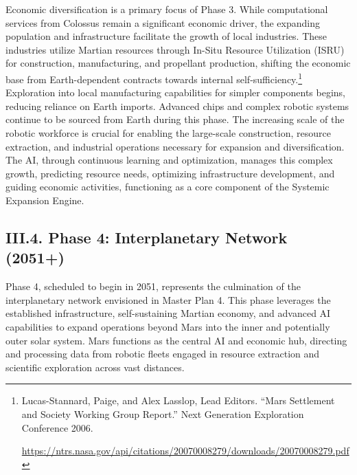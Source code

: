 \documentclass[fontsize=10pt, oneside, DIV=calc]{scrartcl}
\begin{document}
\medskip

\noindent Economic diversification is a primary focus of Phase 3. While computational services from Colossus remain a significant economic driver, the expanding population and infrastructure facilitate the growth of local industries. These industries utilize Martian resources through In-Situ Resource Utilization (ISRU) for construction, manufacturing, and propellant production, shifting the economic base from Earth-dependent contracts towards internal self-sufficiency.\footnote{Lucas-Stannard, Paige, and Alex Lasslop, Lead Editors. ``Mars Settlement and Society Working Group Report.'' Next Generation Exploration Conference 2006. 







\href{https://ntrs.nasa.gov/api/citations/20070008279/downloads/20070008279.pdf}\url{https://ntrs.nasa.gov/api/citations/20070008279/downloads/20070008279.pdf}} Exploration into local manufacturing capabilities for simpler components begins, reducing reliance on Earth imports. Advanced chips and complex robotic systems continue to be sourced from Earth during this phase. The increasing scale of the robotic workforce is crucial for enabling the large-scale construction, resource extraction, and industrial operations necessary for expansion and diversification. The AI, through continuous learning and optimization, manages this complex growth, predicting resource needs, optimizing infrastructure development, and guiding economic activities, functioning as a core component of the Systemic Expansion Engine.



\subsection*{III.4. Phase 4: Interplanetary Network (2051+)}



\medskip

\noindent
Phase 4, scheduled to begin in 2051, represents the culmination of the interplanetary network envisioned in Master Plan 4. This phase leverages the established infrastructure, self-sustaining Martian economy, and advanced AI capabilities to expand operations beyond Mars into the inner and potentially outer solar system. Mars functions as the central AI and economic hub, directing and processing data from robotic fleets engaged in resource extraction and scientific exploration across vast distances.
\end{document}
